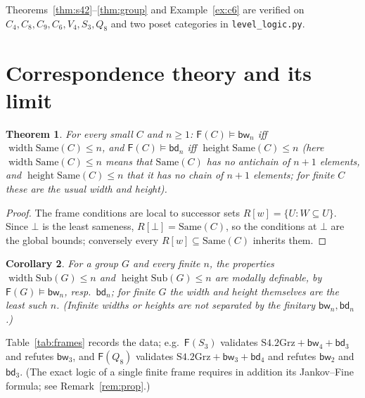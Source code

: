 \documentclass[11pt]{amsart}
\newtheorem{thm}{Theorem}[section]
\newtheorem{cor}[thm]{Corollary}
\theoremstyle{definition}
\newcommand{\Same}{\mathrm{Same}}
\newcommand{\Sub}{\mathrm{Sub}}
\newcommand{\Fr}{\mathsf{F}}
\newcommand{\bw}{\mathsf{bw}}
\newcommand{\bd}{\mathsf{bd}}
\DeclareMathOperator{\wid}{width}
\DeclareMathOperator{\hgt}{height}
\begin{document}
Theorems~\ref{thm:s42}--\ref{thm:group} and Example~\ref{ex:c6} are verified on
$C_4,C_8,C_9,C_6,V_4,S_3,Q_8$ and two poset categories in
\texttt{level\_logic.py}.

\section{Correspondence theory and its limit}\label{sec:corr}

\begin{thm}\label{thm:corr}
For every small $C$ and $n\ge1$:
$\Fr(C)\models\bw_n$ iff $\wid\Same(C)\le n$, and
$\Fr(C)\models\bd_n$ iff $\hgt\Same(C)\le n$
(here $\wid\Same(C)\le n$ means that $\Same(C)$ has no antichain of $n{+}1$
elements, and $\hgt\Same(C)\le n$ that it has no chain of $n{+}1$ elements;
for finite $C$ these are the usual width and height).
\end{thm}
\begin{proof}
The frame conditions are local to successor sets $R[w]=\{U:W\subseteq U\}$.
Since $\bot$ is the least sameness, $R[\bot]=\Same(C)$, so the conditions at
$\bot$ are the global bounds; conversely every $R[w]\subseteq\Same(C)$ inherits
them.
\end{proof}

\begin{cor}
For a group $G$ and every finite $n$, the properties $\wid\Sub(G)\le n$ and
$\hgt\Sub(G)\le n$ are modally definable, by $\Fr(G)\models\bw_n$, resp.\
$\bd_n$; for finite $G$ the width and height themselves are the least such $n$.
(Infinite widths or heights are not separated by the finitary $\bw_n,\bd_n$.)
\end{cor}

Table~\ref{tab:frames} records the data; e.g.\ $\Fr(S_3)$ validates
$\mathrm{S4.2Grz}+\bw_4+\bd_3$ and refutes $\bw_3$, and $\Fr(Q_8)$ validates
$\mathrm{S4.2Grz}+\bw_3+\bd_4$ and refutes $\bw_2$ and $\bd_3$. (The exact
logic of a single finite frame requires in addition its Jankov--Fine formula;
see Remark~\ref{rem:prop}.)
\end{document}

